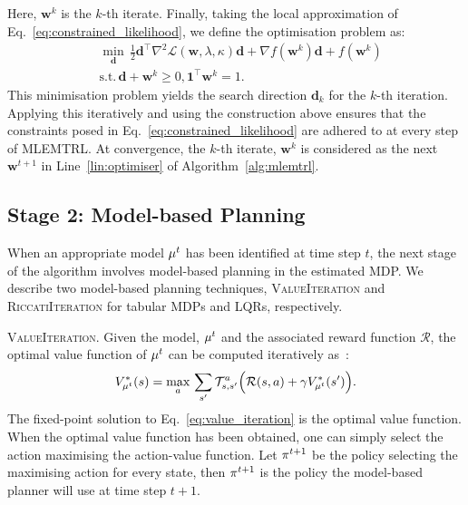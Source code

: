 Here, $\bm{w}^k$ is the $k$-th iterate. Finally, taking the local approximation of Eq.~\eqref{eq:constrained_likelihood}, we define the optimisation problem as:
\begin{equation}
    \begin{aligned}
        &\underset{\bm{d}}{\min} \, \frac{1}{2}\bm{d}^\top \nabla^2 \mathcal{L}(\bm{w},\lambda,\kappa)\bm{d}+\nabla f(\bm{w}^k)\bm{d}+f(\bm{w}^k)\\
        &\textrm{s.t.} \, \bm{d} + \bm{w}^k \geq 0, \mathbf{1}^\top\bm{w}^k = 1.
    \end{aligned}
\end{equation}
This minimisation problem yields the search direction $\bm{d}_k$ for the $k$-th iteration. Applying this iteratively and using the construction above ensures that the constraints posed in Eq.~\eqref{eq:constrained_likelihood} are adhered to at every step of MLEMTRL. At convergence, the $k$-th iterate, $\bm{w}^k$ is considered as the next $\bm{w}^{t+1}$ in Line~\ref{lin:optimiser} of Algorithm~\ref{alg:mlemtrl}.

\subsection{Stage 2: Model-based Planning}
When an appropriate model $\mu^t$ has been identified at time step $t$, the next stage of the algorithm involves model-based planning in the estimated MDP. We describe two model-based planning techniques, \textsc{ValueIteration} and \textsc{RiccatiIteration} for tabular MDPs and LQRs, respectively.

\noindent\textsc{ValueIteration.}
Given the model, $\mu^t$ and the associated reward function $\mathcal{R}$, the optimal value function of $\mu^t$ can be computed iteratively as~\citep{sutton2018reinforcement}:
\begin{equation}\label{eq:value_iteration}
    V_{\mu^t}^{*}(s) = \underset{a}{\max} \, \sum_{s'}\mathcal{T}_{s,s'}^a\Big(\mathcal{R}(s,a)+\gamma V_{\mu^t}^{*}(s')\Big).
\end{equation}
The fixed-point solution to Eq.~\eqref{eq:value_iteration} is the optimal value function. When the optimal value function has been obtained, one can simply select the action maximising the action-value function. Let $\pi^{t+1}$ be the policy selecting the maximising action for every state, then $\pi^{t+1}$ is the policy the model-based planner will use at time step $t+1$.

